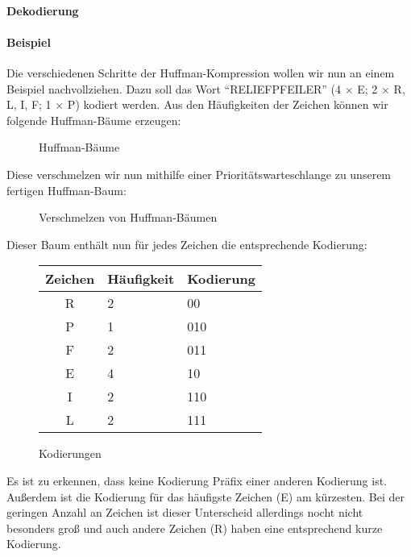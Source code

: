 \paragraph{Dekodierung}

\paragraph{Beispiel}

Die verschiedenen Schritte der Huffman-Kompression wollen wir nun an einem Beispiel nachvollziehen.
Dazu soll das Wort "`RELIEFPFEILER"' (4 $\times$ E; 2 $\times$ R, L, I, F; 1 $\times$ P) kodiert werden.
Aus den Häufigkeiten der Zeichen können wir folgende Huffman-Bäume erzeugen:

\begin{figure}[h]%
\caption{Huffman-Bäume}
\label{fig:HuffmanBaeume}
\end{figure}

Diese verschmelzen wir nun mithilfe einer Prioritätswarteschlange zu unserem fertigen Huffman-Baum:

\begin{figure}[h]%
\caption{Verschmelzen von Huffman-Bäumen}
\label{fig:VerschmelzenVonHuffmanbaeumen}
\end{figure}

Dieser Baum enthält nun für jedes Zeichen die entsprechende Kodierung:

\begin{figure}[h]%
\begin{center}
\begin{tabular}{c|l|l}
Zeichen	& Häufigkeit	& Kodierung	\\\hline
R	& 2		& 00		\\
P	& 1		& 010		\\
F	& 2		& 011		\\
E	& 4		& 10		\\
I	& 2		& 110		\\
L	& 2		& 111
\end{tabular}
\end{center}
\caption{Kodierungen}
\label{fig:KodierungenHuffman}
\end{figure}

Es ist zu erkennen, dass keine Kodierung Präfix einer anderen Kodierung ist.
Außerdem ist die Kodierung für das häufigste Zeichen (E) am kürzesten.
Bei der geringen Anzahl an Zeichen ist dieser Unterscheid allerdings nocht nicht besonders groß
und auch andere Zeichen (R) haben eine entsprechend kurze Kodierung.

